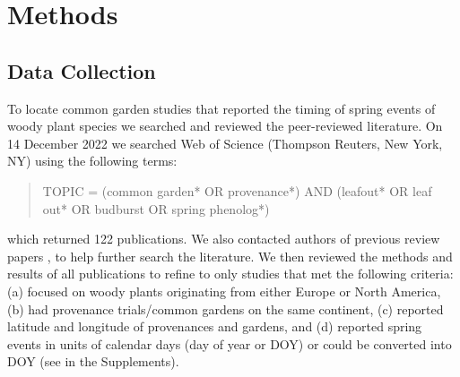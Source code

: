 \documentclass{article}
\begin{document}
\section{Methods}
\subsection{Data Collection}
To locate common garden studies that reported the timing of spring events of woody plant species we searched and reviewed the peer-reviewed literature. On 14 December 2022 we searched Web of Science (Thompson Reuters, New York, NY) using the following terms:
\begin{quote}
TOPIC = (common garden* OR provenance*) AND (leafout* OR leaf out* OR budburst OR spring phenolog*)
\end{quote}
which returned 122 publications. We also contacted authors of previous review papers \citep{AitkenBemmels16, Alberto13}, to help further search the literature. We then reviewed the methods and results of all publications to refine to only studies that met the following criteria: (a) focused on woody plants originating from either Europe or North America, (b) had provenance trials/common gardens on the same continent, (c) reported latitude and longitude of provenances and gardens, and (d) reported spring events in units of calendar days (day of year or DOY) or could be converted into DOY (see  in the Supplements).
\end{document}
